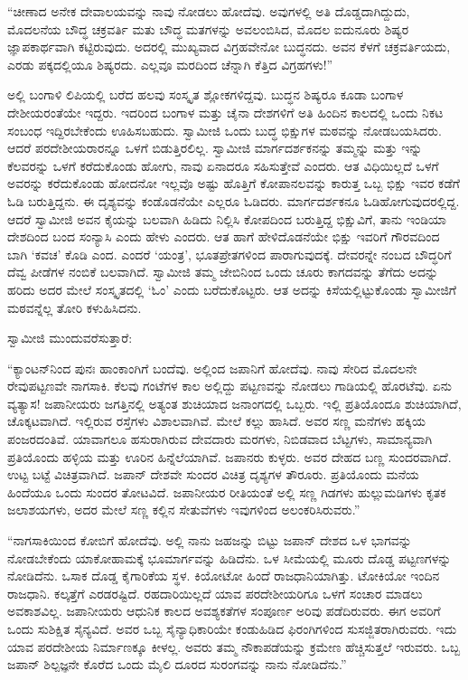 “ಚೀಣಾದ ಅನೇಕ ದೇವಾಲಯವನ್ನು ನಾವು ನೋಡಲು ಹೋದೆವು. ಅವುಗಳಲ್ಲಿ ಅತಿ ದೊಡ್ಡದಾಗಿದ್ದುದು, ಮೊದಲನೆಯ ಬೌದ್ಧ ಚಕ್ರವರ್ತಿ ಮತು ಬೌದ್ಧ ಮತಗಳನ್ನು ಅವಲಂಬಿಸಿದ, ಮೊದಲ ಐದುನೂರು ಶಿಷ್ಯರ ಜ್ಞಾಪಕಾರ್ಥವಾಗಿ ಕಟ್ಟಿರುವುದು. ಅದರಲ್ಲಿ ಮುಖ್ಯವಾದ ವಿಗ್ರಹವೇನೋ ಬುದ್ಧನದು. ಅವನ ಕೆಳಗೆ ಚಕ್ರವರ್ತಿಯದು, ಎರಡು ಪಕ್ಕದಲ್ಲಿಯೂ ಶಿಷ್ಯರದು. ಎಲ್ಲವೂ ಮರದಿಂದ ಚೆನ್ನಾಗಿ ಕೆತ್ತಿದ ವಿಗ್ರಹಗಳು!” 

 ಅಲ್ಲಿ ಬಂಗಾಳಿ ಲಿಪಿಯಲ್ಲಿ ಬರೆದ ಹಲವು ಸಂಸ್ಕೃತ ಶ್ಲೋಕಗಳಿದ್ದವು. ಬುದ್ಧನ ಶಿಷ್ಯರೂ ಕೂಡಾ ಬಂಗಾಳ ದೇಶೀಯರಂತೆಯೇ ಇದ್ದರು. ಇದರಿಂದ ಬಂಗಾಳ ಮತ್ತು ಚೈನಾ ದೇಶಗಳಿಗೆ ಅತಿ ಹಿಂದಿನ ಕಾಲದಲ್ಲಿ ಒಂದು ನಿಕಟ ಸಂಬಂಧ ಇದ್ದಿರಬೇಕೆಂದು ಊಹಿಸಬಹುದು. ಸ್ವಾಮೀಜಿ ಒಂದು ಬುದ್ಧ ಭಿಕ್ಷುಗಳ ಮಠವನ್ನು ನೋಡಬಯಸಿದರು. ಆದರೆ ಪರದೇಶೀಯರಾರನ್ನೂ ಒಳಗೆ ಬಿಡುತ್ತಿರಲಿಲ್ಲ. ಸ್ವಾಮೀಜಿ ಮಾರ್ಗದರ್ಶಕನನ್ನು ತಮ್ಮನ್ನು ಮತ್ತು ಇನ್ನು ಕೆಲವರನ್ನು ಒಳಗೆ ಕರೆದುಕೊಂಡು ಹೋಗು, ನಾವು ಏನಾದರೂ ಸಹಿಸುತ್ತೇವೆ ಎಂದರು. ಆತ ವಿಧಿಯಿಲ್ಲದೆ ಒಳಗೆ ಅವರನ್ನು ಕರೆದುಕೊಂಡು ಹೋದನೋ ಇಲ್ಲವೊ ಅಷ್ಟು ಹೊತ್ತಿಗೆ ಕೋಪಾನಲವನ್ನು ಕಾರುತ್ತ ಒಬ್ಬ ಭಿಕ್ಷು ಇವರ ಕಡೆಗೆ ಓಡಿ ಬರುತ್ತಿದ್ದನು. ಈ ದೃಶ್ಯವನ್ನು ಕಂಡೊಡನೆಯೇ ಎಲ್ಲರೂ ಓಡಿದರು. ಮಾರ್ಗದರ್ಶಕನೂ ಓಡಿಹೋಗುವುದರಲ್ಲಿದ್ದ. ಆದರೆ ಸ್ವಾಮೀಜಿ ಅವನ ಕೈಯನ್ನು ಬಲವಾಗಿ ಹಿಡಿದು ನಿಲ್ಲಿಸಿ ಕೋಪದಿಂದ ಬರುತ್ತಿದ್ದ ಭಿಕ್ಷುವಿಗೆ, ತಾನು ಇಂಡಿಯಾ ದೇಶದಿಂದ ಬಂದ ಸಂನ್ಯಾಸಿ ಎಂದು ಹೇಳು ಎಂದರು. ಆತ ಹಾಗೆ ಹೇಳಿದೊಡನೆಯೇ ಭಿಕ್ಷು ಇವರಿಗೆ ಗೌರವದಿಂದ ಬಾಗಿ ‘ಕವಚ’ ಕೊಡಿ ಎಂದ. ಎಂದರೆ ‘ಯಂತ್ರ’, ಭೂತಪ್ರೇತಗಳಿಂದ ಪಾರಾಗುವುದಕ್ಕೆ. ದೇವರನ್ನೇ ನಂಬದ ಬೌದ್ಧರಿಗೆ ದೆವ್ವ ಪೀಡೆಗಳ ನಂಬಿಕೆ ಬಲವಾಗಿದೆ. ಸ್ವಾಮೀಜಿ ತಮ್ಮ ಜೇಬಿನಿಂದ ಒಂದು ಚೂರು ಕಾಗದವನ್ನು ತೆಗೆದು ಅದನ್ನು ಹರಿದು ಅದರ ಮೇಲೆ ಸಂಸ್ಕೃತದಲ್ಲಿ ‘ಓಂ’ ಎಂದು ಬರೆದುಕೊಟ್ಟರು. ಆತ ಅದನ್ನು ಕಿಸೆಯಲ್ಲಿಟ್ಟುಕೊಂಡು ಸ್ವಾಮೀಜಿಗೆ ಮಠವನ್ನೆಲ್ಲ ತೋರಿ ಕಳುಹಿಸಿದನು. 

 ಸ್ವಾಮೀಜಿ ಮುಂದುವರೆಸುತ್ತಾರೆ:

 “ಕ್ಯಾಂಟನ್‍ನಿಂದ ಪುನಃ ಹಾಂಕಾಂಗಿಗೆ ಬಂದೆವು. ಅಲ್ಲಿಂದ ಜಪಾನಿಗೆ ಹೋದೆವು. ನಾವು ಸೇರಿದ ಮೊದಲನೇ ರೇವುಪಟ್ಟಣವೇ ನಾಗಸಾಕಿ. ಕೆಲವು ಗಂಟೆಗಳ ಕಾಲ ಅಲ್ಲಿದ್ದು ಪಟ್ಟಣವನ್ನು ನೋಡಲು ಗಾಡಿಯಲ್ಲಿ ಹೊರಟೆವು. ಏನು ವ್ಯತ್ಯಾಸ! ಜಪಾನೀಯರು ಜಗತ್ತಿನಲ್ಲಿ ಅತ್ಯಂತ ಶುಚಿಯಾದ ಜನಾಂಗದಲ್ಲಿ ಒಬ್ಬರು. ಇಲ್ಲಿ ಪ್ರತಿಯೊಂದೂ ಶುಚಿಯಾಗಿದೆ, ಚೊಕ್ಕಟವಾಗಿದೆ. ಇಲ್ಲಿರುವ ರಸ್ತೆಗಳು ವಿಶಾಲವಾಗಿವೆ. ಮೇಲೆ ಕಲ್ಲು ಹಾಸಿದೆ. ಅವರ ಸಣ್ಣ ಮನೆಗಳು ಹಕ್ಕಿಯ ಪಂಜರದಂತಿವೆ. ಯಾವಾಗಲೂ ಹಸುರಾಗಿರುವ ದೇವದಾರು ಮರಗಳು, ನಿಬಿಡವಾದ ಬೆಟ್ಟಗಳು, ಸಾಮಾನ್ಯವಾಗಿ ಪ್ರತಿಯೊಂದು ಹಳ್ಳಿಯ ಮತ್ತು ಊರಿನ ಹಿನ್ನೆಲೆಯಾಗಿವೆ. ಜಪಾನರು ಕುಳ್ಳರು. ಅವರ ದೇಹದ ಬಣ್ಣ ಸುಂದರವಾಗಿದೆ. ಉಟ್ಟ ಬಟ್ಟೆ ವಿಚಿತ್ರವಾಗಿದೆ. ಜಪಾನ್ ದೇಶವೇ ಸುಂದರ ವಿಚಿತ್ರ ದೃಶ್ಯಗಳ ತೌರೂರು. ಪ್ರತಿಯೊಂದು ಮನೆಯ ಹಿಂದೆಯೂ ಒಂದು ಸುಂದರ ತೋಟವಿದೆ. ಜಪಾನೀಯರ ರೀತಿಯಂತೆ ಅಲ್ಲಿ ಸಣ್ಣ ಗಿಡಗಳು ಹುಲ್ಲುಮಡಿಗಳು ಕೃತಕ ಜಲಾಶಯಗಳು, ಅದರ ಮೇಲೆ ಸಣ್ಣ ಕಲ್ಲಿನ ಸೇತುವೆಗಳು ಇವುಗಳಿಂದ ಅಲಂಕರಿಸಿರುವರು.” 

 “ನಾಗಸಾಕಿಯಿಂದ ಕೋಬಿಗೆ ಹೋದೆವು. ಅಲ್ಲಿ ನಾನು ಜಹಜನ್ನು ಬಿಟ್ಟು ಜಪಾನ್ ದೇಶದ ಒಳ ಭಾಗವನ್ನು ನೋಡಬೇಕೆಂದು ಯಾಕೋಹಾಮಕ್ಕೆ ಭೂಮಾರ್ಗವನ್ನು ಹಿಡಿದೆನು. ಒಳ ಸೀಮೆಯಲ್ಲಿ ಮೂರು ದೊಡ್ಡ ಪಟ್ಟಣಗಳನ್ನು ನೋಡಿದೆನು. ಒಸಾಕ ದೊಡ್ಡ ಕೈಗಾರಿಕೆಯ ಸ್ಥಳ. ಕಿಯೋಟೋ ಹಿಂದೆ ರಾಜಧಾನಿಯಾಗಿತ್ತು. ಟೋಕಿಯೋ ಇಂದಿನ ರಾಜಧಾನಿ. ಕಲ್ಕತ್ತೆಗೆ ಎರಡರಷ್ಟಿದೆ. ರಹದಾರಿಯಿಲ್ಲದೆ ಯಾವ ಪರದೇಶೀಯರಿಗೂ ಒಳಗೆ ಸಂಚಾರ ಮಾಡಲು ಅವಕಾಶವಿಲ್ಲ. ಜಪಾನೀಯರು ಆಧುನಿಕ ಕಾಲದ ಅವಶ್ಯಕತೆಗಳ ಸಂಪೂರ್ಣ ಅರಿವು ಪಡೆದಿರುವರು. ಈಗ ಅವರಿಗೆ ಒಂದು ಸುಶಿಕ್ಷಿತ ಸೈನ್ಯವಿದೆ. ಅವರ ಒಬ್ಬ ಸೈನ್ಯಾಧಿಕಾರಿಯೇ ಕಂಡುಹಿಡಿದ ಫಿರಂಗಿಗಳಿಂದ ಸುಸಜ್ಜಿತರಾಗಿರುವರು. ಇದು ಯಾವ ಪರದೇಶೀಯ ನಿರ್ಮಾಣಕ್ಕೂ ಕೀಳಲ್ಲ. ಅವರು ತಮ್ಮ ನೌಕಾಪಡೆಯನ್ನು ಕ್ರಮೇಣ ಹೆಚ್ಚಿಸುತ್ತಲೆ ಇರುವರು. ಒಬ್ಬ ಜಪಾನ್ ಶಿಲ್ಪಜ್ಞನೇ ಕೊರೆದ ಒಂದು ಮೈಲಿ ದೂರದ ಸುರಂಗವನ್ನು ನಾನು ನೋಡಿದೆನು.” 

